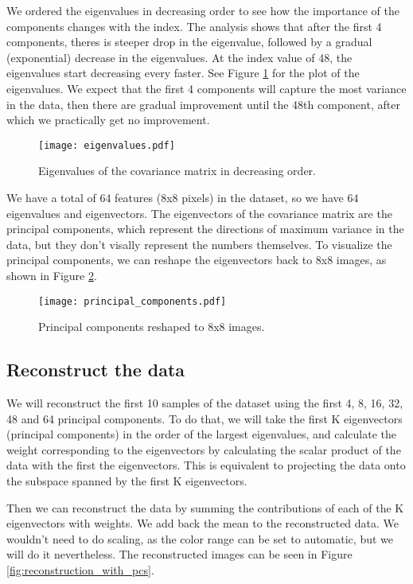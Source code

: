 \documentclass{article}
\begin{document}
We ordered the eigenvalues in decreasing order to see
how the importance of the components changes with the index.
The analysis shows that after the first 4 components,
theres is steeper drop in the eigenvalue,
followed by a gradual (exponential) decrease in the eigenvalues.
At the index value of 48, the eigenvalues start decreasing every faster.
See Figure \ref{fig:eigenvalues} for the plot of the eigenvalues.
We expect that the first 4 components will capture the most variance in the data,
then there are gradual improvement until the 48th component,
after which we practically get no improvement.

\begin{figure}[h!]
    \centering
    \texttt{[image: eigenvalues.pdf]}
    \caption{Eigenvalues of the covariance matrix in decreasing order.}
    \label{fig:eigenvalues}
\end{figure}

We have a total of 64 features (8x8 pixels) in the dataset,
so we have 64 eigenvalues and eigenvectors.
The eigenvectors of the covariance matrix are the principal components,
which represent the directions of maximum variance in the data,
but they don't visally represent the numbers themselves.
To visualize the principal components,
we can reshape the eigenvectors back to 8x8 images, as shown in Figure \ref{fig:principal_components}.

\begin{figure}[h!]
    \centering
    \texttt{[image: principal\_components.pdf]}
    \caption{Principal components reshaped to 8x8 images.}
    \label{fig:principal_components}
\end{figure}

\subsection{Reconstruct the data}
We will reconstruct the first 10 samples of the dataset using the first
4, 8, 16, 32, 48 and 64 principal components.
To do that, we will take the first K eigenvectors (principal components)
in the order of the largest eigenvalues,
and calculate the weight corresponding to the eigenvectors
by calculating the scalar product of the data with the first the eigenvectors.
This is equivalent to projecting the data onto the subspace spanned by the first K eigenvectors.

Then we can reconstruct the data by
summing the contributions of each of the K eigenvectors with weights.
We add back the mean to the reconstructed data.
We wouldn't need to do scaling, as the color range can be set to automatic,
but we will do it nevertheless.
The reconstructed images can be seen in Figure \ref{fig:reconstruction_with_pcs}.
\end{document}
